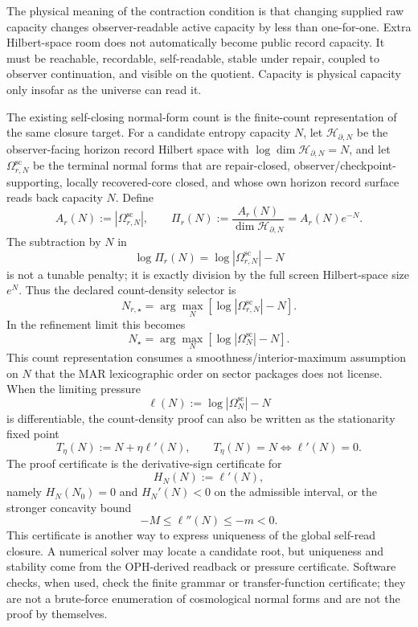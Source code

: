 The physical meaning of the contraction condition is that changing supplied raw capacity changes
observer-readable active capacity by less than one-for-one. Extra Hilbert-space room does not
automatically become public record capacity. It must be reachable, recordable, self-readable,
stable under repair, coupled to observer continuation, and visible on the quotient. Capacity is
physical capacity only insofar as the universe can read it.

The existing self-closing normal-form count is the finite-count representation of the same closure target. For
a candidate entropy capacity \(N\), let \(\mathcal H_{\partial,N}\) be the observer-facing horizon
record Hilbert space with \(\log\dim\mathcal H_{\partial,N}=N\), and let
\(\Omega^{\mathrm{sc}}_{r,N}\) be the terminal normal forms that are repair-closed,
observer/checkpoint-supporting, locally recovered-core closed, and whose own horizon record surface
reads back capacity \(N\). Define
\[
A_r(N):=|\Omega^{\mathrm{sc}}_{r,N}|,
\qquad
\Pi_r(N):=\frac{A_r(N)}{\dim\mathcal H_{\partial,N}}=A_r(N)e^{-N}.
\]
The subtraction by \(N\) in
\[
\log\Pi_r(N)=\log|\Omega^{\mathrm{sc}}_{r,N}|-N
\]
is not a tunable penalty; it is exactly division by the full screen Hilbert-space size \(e^N\).
Thus the declared count-density selector is
\[
N_{r,\star}
=
\arg\max_N
\left[\log|\Omega^{\mathrm{sc}}_{r,N}|-N\right].
\]
In the refinement limit this becomes
\[
N_\star
=
\arg\max_N
\left[\log|\Omega^{\mathrm{sc}}_N|-N\right].
\]
This count representation consumes a smoothness/interior-maximum assumption on \(N\) that the
MAR lexicographic order on sector packages does not license.
When the limiting pressure
\[
\ell(N):=\log|\Omega^{\mathrm{sc}}_N|-N
\]
is differentiable, the count-density proof can also be written as the stationarity fixed point
\[
T_\eta(N):=N+\eta\ell'(N),
\qquad
T_\eta(N)=N\Longleftrightarrow \ell'(N)=0.
\]
The proof certificate is the derivative-sign certificate for
\[
H_N(N):=\ell'(N),
\]
namely \(H_N(N_0)=0\) and \(H_N'(N)<0\) on the admissible interval, or the stronger concavity bound
\[
-M\le\ell''(N)\le -m<0.
\]
This certificate is another way to express uniqueness of the global self-read closure. A numerical
solver may locate a candidate root, but uniqueness and stability come from the OPH-derived
readback or pressure certificate. Software checks, when used, check the finite grammar or
transfer-function certificate; they are not a brute-force enumeration of cosmological normal
forms and are not the proof by themselves.

